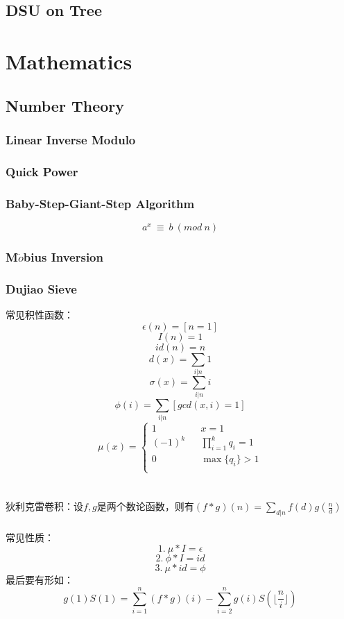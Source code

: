 \documentclass[10pt,UTF8,a4paper,twoside]{ctexart}
\begin{document}
\begin{multicols}{2}
	\subsection{DSU on Tree}
\clearpage

\section{Mathematics}
	\subsection{Number Theory}
		\subsubsection{Linear Inverse Modulo}
			
		\subsubsection{Quick Power}
			
		\subsubsection{Baby-Step-Giant-Step Algorithm}
			$$ a^{x}\ \equiv \ b \ (mod \ n)  $$
			
		\subsubsection{M$\ddot{o}$bius Inversion}
		\subsubsection{Dujiao Sieve}
			常见积性函数：
				$$\epsilon(n)=[n=1] $$
				$$I(n)=1 $$
				$$id(n)=n $$
				$$d(x)=\sum_{i|n}{1}$$
				$$\sigma(x)=\sum_{i|n}{i}$$
				$$\phi(i)=\sum_{i|n}{[gcd(x,i)=1]}$$
				\begin{equation}
					\nonumber
					\mu(x)=\left\{
					\begin{array}{rcl}
						1 & & {x=1}\\
						(-1)^k & & {\prod_{i=1}^{k}{q_i}=1}\\
						0 & & \max{\{q_i\}} > 1\\
					\end{array} \right.
				\end{equation} \\\\
			狄利克雷卷积：设$f, g$是两个数论函数，则有$(f\ast g)(n)=\sum_{d|n}{f(d)g(\frac{n}{d})}$ \\\\
			常见性质：
				$$ 1. \ \mu\ast I=\epsilon $$
				$$ 2. \ \phi\ast I=id $$
				$$ 3. \ \mu\ast id = \phi $$
			最后要有形如：
			$$g(1)S(1)=\sum_{i=1}^{n}{(f*g)(i)} - \sum_{i=2}^{n}{g(i)S(\lfloor \frac{n}{i} \rfloor)} $$
			

\end{multicols}
\end{document}
